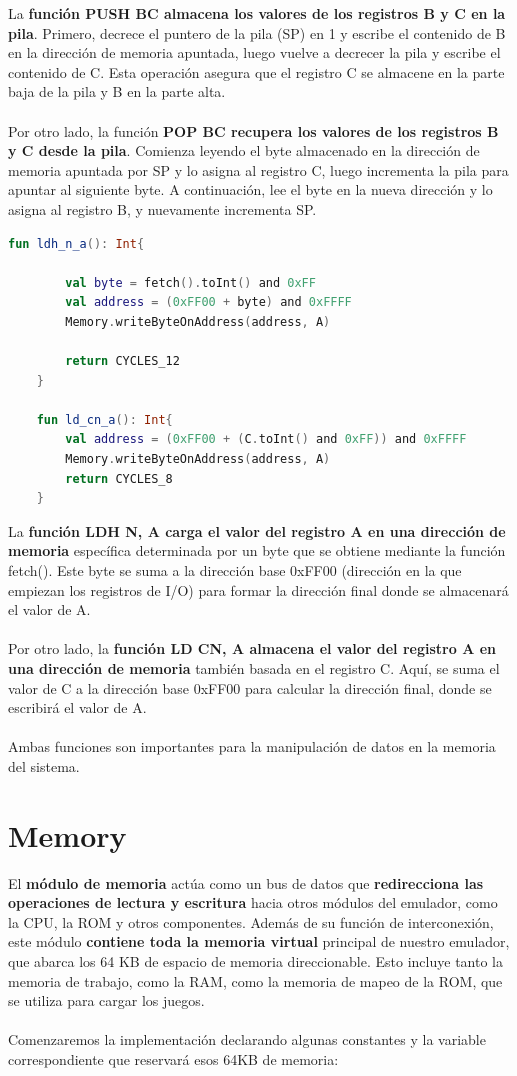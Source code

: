 La \textbf{función PUSH BC almacena los valores de los registros B y C en la pila}. Primero, decrece el puntero de la pila (SP) en 1 y escribe el contenido de B en la dirección de memoria apuntada, luego vuelve a decrecer la pila y escribe el contenido de C. Esta operación asegura que el registro C se almacene en la parte baja de la pila y B en la parte alta.
\\\\
Por otro lado, la función \textbf{POP BC recupera los valores de los registros B y C desde la pila}. Comienza leyendo el byte almacenado en la dirección de memoria apuntada por SP y lo asigna al registro C, luego incrementa la pila para apuntar al siguiente byte. A continuación, lee el byte en la nueva dirección y lo asigna al registro B, y nuevamente incrementa SP.
\clearpage
\begin{lstlisting}[language=Kotlin, caption={Operaciones I/O}, label={code:kotlinio}]
    fun ldh_n_a(): Int{

        val byte = fetch().toInt() and 0xFF
        val address = (0xFF00 + byte) and 0xFFFF
        Memory.writeByteOnAddress(address, A)

        return CYCLES_12
    }

    fun ld_cn_a(): Int{
        val address = (0xFF00 + (C.toInt() and 0xFF)) and 0xFFFF
        Memory.writeByteOnAddress(address, A)
        return CYCLES_8
    }
\end{lstlisting}

La \textbf{función LDH N, A carga el valor del registro A en una dirección de memoria} específica determinada por un byte que se obtiene mediante la función fetch(). Este byte se suma a la dirección base 0xFF00 (dirección en la que empiezan los registros de I/O) para formar la dirección final donde se almacenará el valor de A.
\\\\
Por otro lado, la \textbf{función LD CN, A almacena el valor del registro A en una dirección de memoria} también basada en el registro C. Aquí, se suma el valor de C a la dirección base 0xFF00 para calcular la dirección final, donde se escribirá el valor de A.
\\\\
Ambas funciones son importantes para la manipulación de datos en la memoria del sistema.

\section{Memory}
El \textbf{módulo de memoria} actúa como un bus de datos que \textbf{redirecciona las operaciones de lectura y escritura} hacia otros módulos del emulador, como la CPU, la ROM y otros componentes. Además de su función de interconexión, este módulo \textbf{contiene toda la memoria virtual} principal de nuestro emulador, que abarca los 64 KB de espacio de memoria direccionable. Esto incluye tanto la memoria de trabajo, como la RAM, como la memoria de mapeo de la ROM, que se utiliza para cargar los juegos.
\\\\
Comenzaremos la implementación declarando algunas constantes y la variable correspondiente que reservará esos 64KB de memoria:

